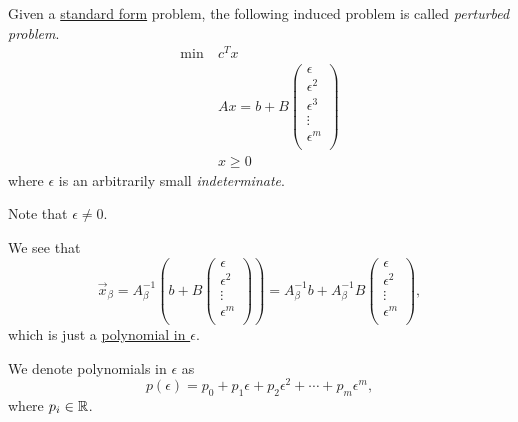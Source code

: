 \begin{definition}\label{def:perturbed-problem}
	Given a \hyperref[def:standard-form]{standard form} problem, the following induced problem is called \emph{perturbed problem}.
	\begin{align*}
		\min~ & c^T x                    \\
		      & Ax = b + B\begin{pmatrix}
			                  \epsilon   \\
			                  \epsilon^2 \\
			                  \epsilon^3 \\
			                  \vdots     \\
			                  \epsilon^m \\
		                  \end{pmatrix} \\
		      & x\geq 0
	\end{align*}
	where \(\epsilon \) is an arbitrarily small \emph{indeterminate}.
\end{definition}

\begin{remark}
	Note that \(\epsilon \neq 0\).
\end{remark}

\begin{note}
	We see that
	\[
		\vec{x}_{\beta} = A^{-1}_{\beta}\left(b + B\begin{pmatrix}
				\epsilon   \\
				\epsilon^2 \\
				\vdots     \\
				\epsilon^m \\
			\end{pmatrix}\right) = A^{-1}_{\beta}b + A^{-1}_{\beta}B\begin{pmatrix}
			\epsilon   \\
			\epsilon^2 \\
			\vdots     \\
			\epsilon^m \\
		\end{pmatrix},
	\]
	which is just a \hyperref[def:polynomial-in-epsilon]{polynomial in \(\epsilon\)}.
\end{note}

\begin{definition}\label{def:polynomial-in-epsilon}
	We denote polynomials in \(\epsilon\) as
	\[
		p(\epsilon) = p_0 + p_1\epsilon + p_2 \epsilon^2 + \cdots + p_{m}\epsilon^m,
	\]
	where \(p_i\in\mathbb{\MakeUppercase{r}}\).
\end{definition}

